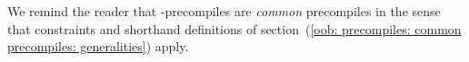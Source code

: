 We remind the reader that \blsMod{}-precompiles are \emph{common} precompiles in the sense that constraints and shorthand definitions of
section~(\ref{oob: precompiles: common precompiles: generalities})
apply.
